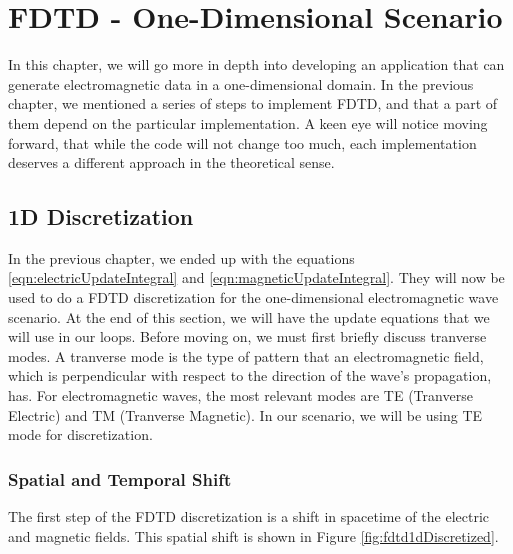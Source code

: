 
\chapter{FDTD - One-Dimensional Scenario} %

\label{Chapter2} %

In this chapter, we will go more in depth into developing an application that can generate electromagnetic data in a one-dimensional domain. In the previous chapter, we mentioned a series of steps to implement FDTD, and that a part of them depend on the particular implementation. A keen eye will notice moving forward, that while the code will not change too much, each implementation deserves a different approach in the theoretical sense.


\section{1D Discretization}

In the previous chapter, we ended up with the equations \ref{eqn:electricUpdateIntegral} and \ref{eqn:magneticUpdateIntegral}. They will now be used to do a FDTD discretization for the one-dimensional electromagnetic wave scenario. At the end of this section, we will have the update equations that we will use in our loops. Before moving on, we must first briefly discuss tranverse modes. A tranverse mode is the type of pattern that an electromagnetic field, which is perpendicular with respect to the direction of the wave's propagation, has. For electromagnetic waves, the most relevant modes are TE (Tranverse Electric) and TM (Tranverse Magnetic). In our scenario, we will be using TE mode for discretization.

\subsection{Spatial and Temporal Shift}

The first step of the FDTD discretization is a shift in spacetime of the electric and magnetic fields. This spatial shift is shown in Figure \ref{fig:fdtd1dDiscretized}.

